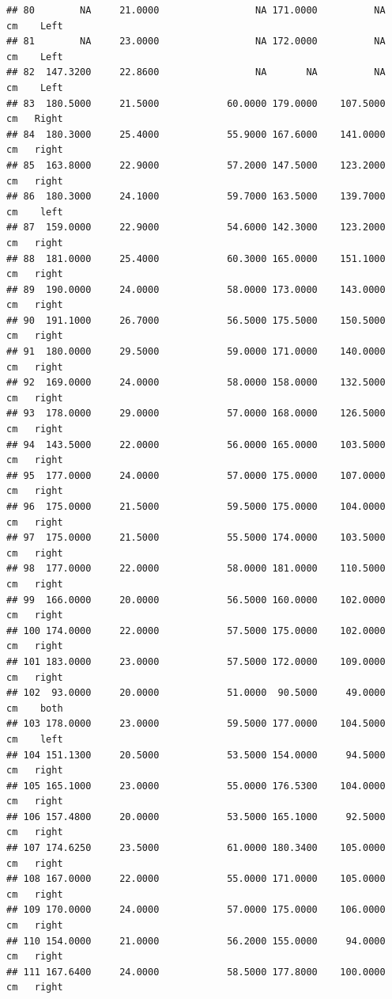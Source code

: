 \documentclass[]{article}
\begin{document}
\begin{verbatim}
## 80        NA     21.0000                 NA 171.0000          NA     cm    Left
## 81        NA     23.0000                 NA 172.0000          NA     cm    Left
## 82  147.3200     22.8600                 NA       NA          NA     cm    Left
## 83  180.5000     21.5000            60.0000 179.0000    107.5000     cm   Right
## 84  180.3000     25.4000            55.9000 167.6000    141.0000     cm   right
## 85  163.8000     22.9000            57.2000 147.5000    123.2000     cm   right
## 86  180.3000     24.1000            59.7000 163.5000    139.7000     cm    left
## 87  159.0000     22.9000            54.6000 142.3000    123.2000     cm   right
## 88  181.0000     25.4000            60.3000 165.0000    151.1000     cm   right
## 89  190.0000     24.0000            58.0000 173.0000    143.0000     cm   right
## 90  191.1000     26.7000            56.5000 175.5000    150.5000     cm   right
## 91  180.0000     29.5000            59.0000 171.0000    140.0000     cm   right
## 92  169.0000     24.0000            58.0000 158.0000    132.5000     cm   right
## 93  178.0000     29.0000            57.0000 168.0000    126.5000     cm   right
## 94  143.5000     22.0000            56.0000 165.0000    103.5000     cm   right
## 95  177.0000     24.0000            57.0000 175.0000    107.0000     cm   right
## 96  175.0000     21.5000            59.5000 175.0000    104.0000     cm   right
## 97  175.0000     21.5000            55.5000 174.0000    103.5000     cm   right
## 98  177.0000     22.0000            58.0000 181.0000    110.5000     cm   right
## 99  166.0000     20.0000            56.5000 160.0000    102.0000     cm   right
## 100 174.0000     22.0000            57.5000 175.0000    102.0000     cm   right
## 101 183.0000     23.0000            57.5000 172.0000    109.0000     cm   right
## 102  93.0000     20.0000            51.0000  90.5000     49.0000     cm    both
## 103 178.0000     23.0000            59.5000 177.0000    104.5000     cm    left
## 104 151.1300     20.5000            53.5000 154.0000     94.5000     cm   right
## 105 165.1000     23.0000            55.0000 176.5300    104.0000     cm   right
## 106 157.4800     20.0000            53.5000 165.1000     92.5000     cm   right
## 107 174.6250     23.5000            61.0000 180.3400    105.0000     cm   right
## 108 167.0000     22.0000            55.0000 171.0000    105.0000     cm   right
## 109 170.0000     24.0000            57.0000 175.0000    106.0000     cm   right
## 110 154.0000     21.0000            56.2000 155.0000     94.0000     cm   right
## 111 167.6400     24.0000            58.5000 177.8000    100.0000     cm   right

\end{verbatim}
\end{document}

